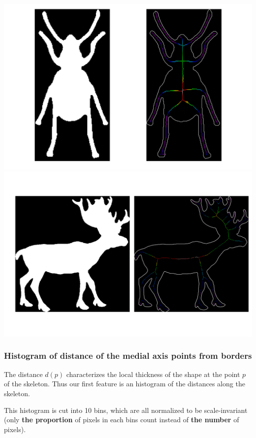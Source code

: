 \documentclass[12pt]{article}
\begin{document}
\vspace{12px}

\includegraphics[scale=0.25]{beetle_281.png}
\includegraphics[scale=0.25]{deer_79.png}

\subsubsection{Histogram of distance of the medial axis points from borders}

The distance $d(p)$ characterizes the local thickness of the shape at the point $p$ of the skeleton. Thus our first feature is an histogram of the distances along the skeleton.

This histogram is cut into 10 bins, which are all normalized to be scale-invariant (only \textbf{the proportion} of pixels in each bins count instead of \textbf{the number} of pixels).
\end{document}
